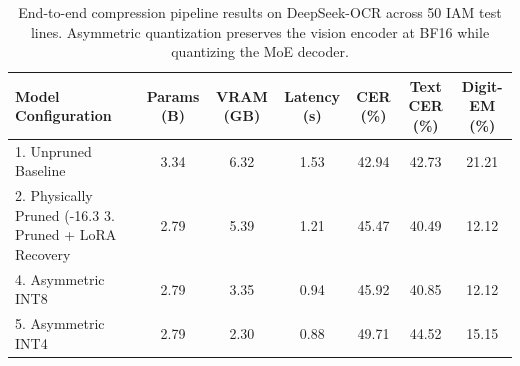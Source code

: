 \begin{table}[t]
\centering
\small
\caption{End-to-end compression pipeline results on DeepSeek-OCR across 50 IAM test lines. Asymmetric quantization preserves the vision encoder at BF16 while quantizing the MoE decoder.}
\label{tab:main_results}
\begin{tabular}{lcccccc}
\toprule
\textbf{Model Configuration} & \textbf{Params (B)} & \textbf{VRAM (GB)} & \textbf{Latency (s)} & \textbf{CER (\%)} & \textbf{Text CER (\%)} & \textbf{Digit-EM (\%)} \\
\midrule
1. Unpruned Baseline & 3.34 & 6.32 & 1.53 & 42.94 & 42.73 & 21.21 \\
2. Physically Pruned (-16.3%
3. Pruned + LoRA Recovery & 2.79 & 5.39 & 1.21 & 45.47 & 40.49 & 12.12 \\
4. Asymmetric INT8 & 2.79 & 3.35 & 0.94 & 45.92 & 40.85 & 12.12 \\
5. Asymmetric INT4 & 2.79 & 2.30 & 0.88 & 49.71 & 44.52 & 15.15 \\
\bottomrule
\end{tabular}
\end{table}
